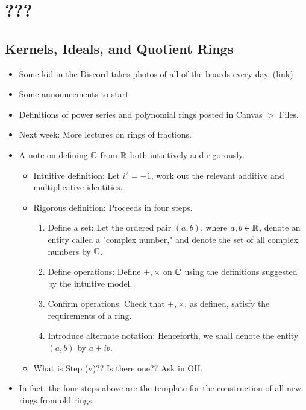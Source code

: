 \documentclass[../notes.tex]{subfiles}
\begin{document}
\chapter{???}
\section{Kernels, Ideals, and Quotient Rings}
\begin{itemize}
    \item {}Some kid in the Discord takes photos of all of the boards every day. (\href{https://uchicagoedu-my.sharepoint.com/:o:/g/personal/billion_uchicago_edu/EgDZ297OD3FFvttHn7lDZZ4BSlzTJFdABON3AdyzvqNyZA?e=D4C5Gs}{link})
    \item Some announcements to start.
    \item Definitions of power series and polynomial rings posted in Canvas $>$ Files.
    \item Next week: More lectures on rings of fractions.
    \item A note on defining $\mathbb{C}$ from $\mathbb{R}$ both intuitively and rigorously.
    \begin{itemize}
        \item Intuitive definition: Let $i^2=-1$, work out the relevant additive and multiplicative identities.
        \item Rigorous definition: Proceeds in four steps.
        \begin{enumerate}[label={(\roman*)}]
            \item Define a set: Let the ordered pair $(a,b)$, where $a,b\in\mathbb{R}$, denote an entity called a "complex number," and denote the set of all complex numbers by $\mathbb{C}$.
            \item Define operations: Define $+,\times$ on $\mathbb{C}$ using the definitions suggested by the intuitive model.
            \item Confirm operations: Check that $+,\times$, as defined, satisfy the requirements of a ring.
            \item Introduce alternate notation: Henceforth, we shall denote the entity $(a,b)$ by $a+ib$.
        \end{enumerate}
        \item What is Step (v)?? Is there one?? Ask in OH.
    \end{itemize}
    \item In fact, the four steps above are the template for the construction of all new rings from old rings.
    \begin{itemize}

\end{itemize}
\end{itemize}
\end{document}
